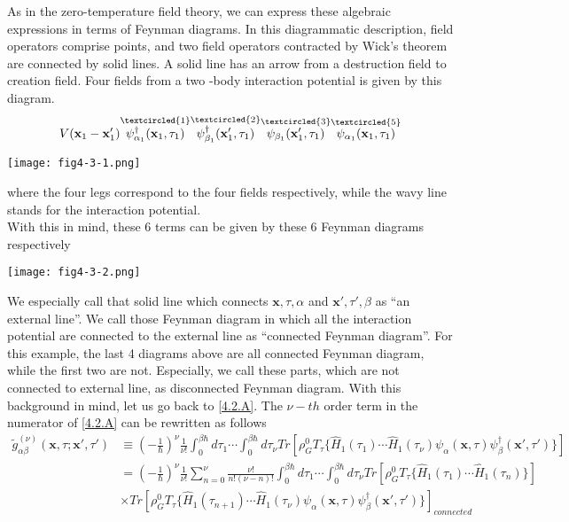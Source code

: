 As in the zero-temperature field theory, we can express these algebraic expressions in terms of Feynman diagrams.
In this diagrammatic description, field operators comprise points, and two field operators contracted by Wick's theorem are connected by solid lines.
A solid line has an arrow from a destruction field to creation field.
Four fields from a two -body interaction potential is given by this diagram.
$$
\begin{aligned}
V(\mathbf{x}_1-\mathbf{x}_1') \overset{\textcircled{1}}{\psi_{\alpha_1}^\dagger (\mathbf{x}_1,\tau_1)} \overset{\textcircled{2}}{\psi_{\beta_1}^\dagger (\mathbf{x}_1',\tau_1)} \overset{\textcircled{3}}{\psi_{\beta_1}(\mathbf{x}_1',\tau_1)} \overset{\textcircled{5}}{\psi_{\alpha_1}(\mathbf{x}_1,\tau_1)}
\end{aligned}
$$
\begin{center}
\texttt{[image: fig4-3-1.png]}
\end{center}
where the four legs correspond to the four fields respectively, while the wavy line stands for the interaction potential.\\
With this in mind, these 6 terms can be given by these 6 Feynman diagrams respectively
\begin{center}
\texttt{[image: fig4-3-2.png]}
\end{center}
We especially call that solid line which connects $\mathbf{x},\tau,\alpha$ and $\mathbf{x}',\tau',\beta$ as ``an external line''.
We call those Feynman diagram in which all the interaction potential are connected to the external line as ``connected Feynman diagram''.
For this example, the last 4 diagrams above are all connected Feynman diagram, while the first two are not.
Especially, we call these parts, which are not connected to external line, as disconnected Feynman diagram.
With this background in mind, let us go back to \ref{4.2.A}.
The $\nu-th$ order term in the numerator of \ref{4.2.A} can be rewritten as follows
$$
\begin{aligned}
\tilde{g}^{(\nu)}_{\alpha\beta}(\mathbf{x},\tau;\mathbf{x}',\tau')&\equiv \left(-\frac{1}{\hbar}\right)^\nu \frac{1}{\nu!} \int_0^{\beta\hbar}d\tau_1\cdots \int_0^{\beta\hbar}d\tau_\nu Tr\left[\rho_G^0 T_\tau\{\hat{H}_1(\tau_1) \cdots \hat{H}_1(\tau_\nu) \psi_\alpha(\mathbf{x},\tau) \psi_\beta^\dagger(\mathbf{x}',\tau')\}\right]\\
&=\left(-\frac{1}{\hbar}\right)^\nu \frac{1}{\nu!} \sum_{n=0}^\nu \frac{\nu!}{n!(\nu-n)!} \int_0^{\beta\hbar}d\tau_1\cdots \int_0^{\beta\hbar}d\tau_\nu Tr\left[\rho_G^0 T_\tau\{\hat{H}_1(\tau_1) \cdots \hat{H}_1(\tau_n)\}\right]\\
&\times Tr\left[\rho_G^0 T_\tau\{\hat{H}_1(\tau_{n+1}) \cdots \hat{H}_1(\tau_\nu) \psi_\alpha(\mathbf{x},\tau) \psi_\beta^\dagger(\mathbf{x}',\tau')\}\right]_{connected}
\end{aligned}
$$
